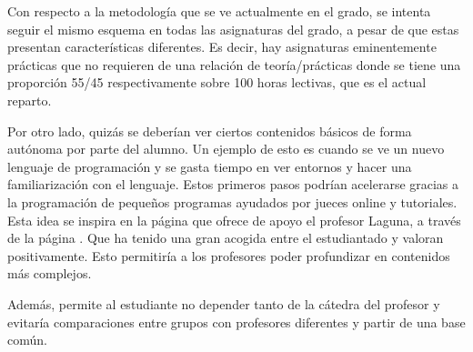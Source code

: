 Con respecto a la metodología que se ve actualmente en el grado, se intenta
seguir el mismo esquema en todas las asignaturas del grado, a pesar de que
estas presentan características diferentes. Es decir, hay asignaturas
eminentemente prácticas que no requieren de una relación de teoría/prácticas
donde se tiene una proporción 55/45 respectivamente sobre 100 horas lectivas, 
que es el actual reparto.

Por otro lado, quizás se deberían ver ciertos contenidos básicos de forma
autónoma por parte del alumno. Un ejemplo de esto es cuando se ve un nuevo
lenguaje de programación y se gasta tiempo en ver entornos y hacer una 
familiarización con el lenguaje. Estos primeros pasos podrían acelerarse
gracias a la programación de pequeños programas ayudados por jueces online y
tutoriales. Esta idea se inspira en la página que ofrece de apoyo el profesor %
Laguna, a través de la página
. Que ha tenido una gran acogida entre el estudiantado y valoran positivamente.
Esto permitiría a los profesores poder profundizar en contenidos más complejos.

Además, permite al estudiante no depender tanto de la cátedra del profesor y evitaría
comparaciones entre grupos con profesores diferentes y partir de una base común.
